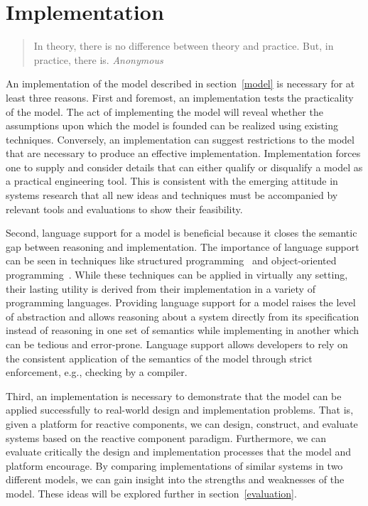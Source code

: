 \chapter{Implementation \label{implementation}}

\begin{quote}
In theory, there is no difference between theory and practice. \linebreak
But, in practice, there is.  \emph{Anonymous}
\end{quote}

An implementation of the model described in section~\ref{model} is necessary for at least three reasons.
First and foremost, an implementation tests the practicality of the model.
The act of implementing the model will reveal whether the assumptions upon which the model is founded can be realized using existing techniques.
Conversely, an implementation can suggest restrictions to the model that are necessary to produce an effective implementation.
Implementation forces one to supply and consider details that can either qualify or disqualify a model as a practical engineering tool.
This is consistent with the emerging attitude in systems research that all new ideas and techniques must be accompanied by relevant tools and evaluations to show their feasibility.

Second, language support for a model is beneficial because it closes the semantic gap between reasoning and implementation.
The importance of language support can be seen in techniques like structured programming~\cite{dahl1972structured} and object-oriented programming~\cite{booch1982object}.
While these techniques can be applied in virtually any setting, their lasting utility is derived from their implementation in a variety of programming languages.
Providing language support for a model raises the level of abstraction and allows reasoning about a system directly from its specification instead of reasoning in one set of semantics while implementing in another which can be tedious and error-prone.
Language support allows developers to rely on the consistent application of the semantics of the model through strict enforcement, e.g., checking by a compiler.

Third, an implementation is necessary to demonstrate that the model can be applied successfully to real-world design and implementation problems.
That is, given a platform for reactive components, we can design, construct, and evaluate systems based on the reactive component paradigm.
Furthermore, we can evaluate critically the design and implementation processes that the model and platform encourage.
By comparing implementations of similar systems in two different models, we can gain insight into the strengths and weaknesses of the model.
These ideas will be explored further in section~\ref{evaluation}.

